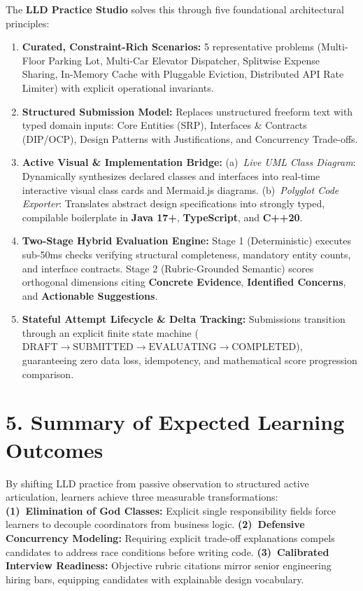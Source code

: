 \documentclass[10pt,a4paper]{article}
\begin{document}
The \textbf{LLD Practice Studio} solves this through five foundational architectural principles:
\begin{enumerate}
  \item \textbf{Curated, Constraint-Rich Scenarios:} 5 representative problems (Multi-Floor Parking Lot, Multi-Car Elevator Dispatcher, Splitwise Expense Sharing, In-Memory Cache with Pluggable Eviction, Distributed API Rate Limiter) with explicit operational invariants.
  \item \textbf{Structured Submission Model:} Replaces unstructured freeform text with typed domain inputs: Core Entities (SRP), Interfaces \& Contracts (DIP/OCP), Design Patterns with Justifications, and Concurrency Trade-offs.
  \item \textbf{Active Visual \& Implementation Bridge:} (a)~\textit{Live UML Class Diagram}: Dynamically synthesizes declared classes and interfaces into real-time interactive visual class cards and Mermaid.js diagrams. (b)~\textit{Polyglot Code Exporter}: Translates abstract design specifications into strongly typed, compilable boilerplate in \textbf{Java 17+}, \textbf{TypeScript}, and \textbf{C++20}.
  \item \textbf{Two-Stage Hybrid Evaluation Engine:} Stage 1 (Deterministic) executes sub-50ms checks verifying structural completeness, mandatory entity counts, and interface contracts. Stage 2 (Rubric-Grounded Semantic) scores orthogonal dimensions citing \textbf{Concrete Evidence}, \textbf{Identified Concerns}, and \textbf{Actionable Suggestions}.
  \item \textbf{Stateful Attempt Lifecycle \& Delta Tracking:} Submissions transition through an explicit finite state machine ($\text{DRAFT} \rightarrow \text{SUBMITTED} \rightarrow \text{EVALUATING} \rightarrow \text{COMPLETED}$), guaranteeing zero data loss, idempotency, and mathematical score progression comparison.
\end{enumerate}

\section{5. Summary of Expected Learning Outcomes}
By shifting LLD practice from passive observation to structured active articulation, learners achieve three measurable transformations:
\textbf{(1)~Elimination of God Classes:} Explicit single responsibility fields force learners to decouple coordinators from business logic.
\textbf{(2)~Defensive Concurrency Modeling:} Requiring explicit trade-off explanations compels candidates to address race conditions before writing code.
\textbf{(3)~Calibrated Interview Readiness:} Objective rubric citations mirror senior engineering hiring bars, equipping candidates with explainable design vocabulary.
\end{document}
